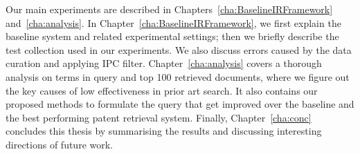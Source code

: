 Our main experiments are described in Chapters~\ref{cha:BaselineIRFramework} and~\ref{cha:analysis}. 
In Chapter~\ref{cha:BaselineIRFramework}, we first explain the baseline system and related experimental settings; 
then we briefly describe the test collection used in our experiments. We also discuss errors caused by the data curation and applying IPC filter.
Chapter~\ref{cha:analysis} covers a thorough analysis on terms in query and top 100 retrieved documents, where we figure out 
the key causes of low effectiveness in prior art search. It also contains our proposed methods to formulate the query that get improved over the baseline and the best performing patent retrieval system. 
Finally, Chapter~\ref{cha:conc} concludes this thesis by 
summarising the results and discussing interesting directions of future work.



